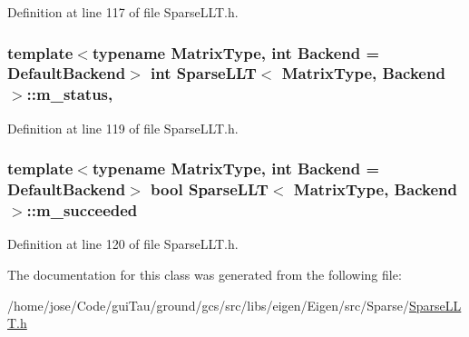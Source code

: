 Definition at line 117 of file Sparse\-L\-L\-T.\-h.

\hypertarget{class_sparse_l_l_t_a4a911c19f92357888a6c3322f64b88c3}{
\subsubsection[{m\-\_\-status}]{\setlength{\rightskip}{0pt plus 5cm}template$<$typename Matrix\-Type, int Backend = Default\-Backend$>$ {\bf int} {\bf Sparse\-L\-L\-T}$<$ Matrix\-Type, Backend $>$\-::m\-\_\-status\hspace{0.3cm}{\ttfamily [mutable]}, {\ttfamily [protected]}}}\label{class_sparse_l_l_t_a4a911c19f92357888a6c3322f64b88c3}


Definition at line 119 of file Sparse\-L\-L\-T.\-h.

\hypertarget{class_sparse_l_l_t_aa5580c40c743555a71d99188879d73ea}{
\subsubsection[{m\-\_\-succeeded}]{\setlength{\rightskip}{0pt plus 5cm}template$<$typename Matrix\-Type, int Backend = Default\-Backend$>$ bool {\bf Sparse\-L\-L\-T}$<$ Matrix\-Type, Backend $>$\-::m\-\_\-succeeded\hspace{0.3cm}{\ttfamily [protected]}}}\label{class_sparse_l_l_t_aa5580c40c743555a71d99188879d73ea}


Definition at line 120 of file Sparse\-L\-L\-T.\-h.



The documentation for this class was generated from the following file\-:\begin{DoxyCompactItemize}
\item 
/home/jose/\-Code/gui\-Tau/ground/gcs/src/libs/eigen/\-Eigen/src/\-Sparse/\hyperlink{_sparse_l_l_t_8h}{Sparse\-L\-L\-T.\-h}\end{DoxyCompactItemize}
